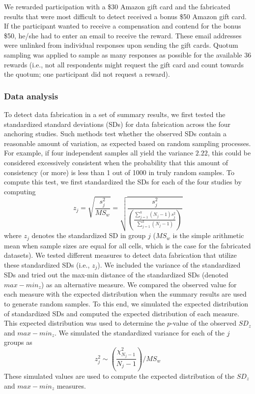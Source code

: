 \documentclass{article}
\begin{document}
We rewarded participation with a \$30 Amazon gift card and the fabricated results that were most difficult to detect received a bonus \$50 Amazon gift card. If the participant wanted to receive a compensation and contend for the bonus \$50, he/she had to enter an email to receive the reward. These email addresses were unlinked from individual responses upon sending the gift cards. Quotum sampling was applied to sample as many responses as possible for the available 36 rewards (i.e., not all respondents might request the gift card and count towards the quotum; one participant did not request a reward).

\subsubsection*{Data analysis}

To detect data fabrication in a set of summary results, we first tested the standardized standard deviations (SDs) for data fabrication \citep{simonsohn2013} across the four anchoring studies. Such methods test whether the observed SDs contain a reasonable amount of variation, as expected based on random sampling processes. For example, if four independent samples all yield the variance $2.22$, this could be considered excessively consistent when the probability that this amount of consistency (or more) is less than 1 out of 1000 in truly random samples. To compute this test, we first standardized the SDs for each of the four studies by computing
\begin{equation}
z_j=\sqrt{\frac{s^2_j}{MS_w}}=\sqrt{\frac{s^2_j}{\left(\frac{\sum\limits^k_{j=1}(N_j-1)s^2_j}{\sum\limits^k_{j=1}(N_j-1)}\right)}}
\label{s2_j}
\end{equation}
where $z_j$ denotes the standardized SD in group $j$ ($MS_w$ is the simple arithmetic mean when sample sizes are equal for all cells, which is the case for the fabricated datasets). We tested different measures to detect data fabrication that utilize these standardized SDs (i.e., $z_j$). We included the variance of the standardized SDs \citep[i.e.,  $SD_{z}$;][]{simonsohn2013} and tried out the max-min distance of the standardized SDs (denoted $max-min_{z}$) as an alternative measure. We compared the observed value for each measure with the expected distribution when the summary results are used to generate random samples. To this end, we simulated the expected distribution of standardized SDs and computed the expected distribution of each measure. This expected distribution was used to determine the $p$-value of the observed $SD_z$ and $max-min_z$. We simulated the standardized variance for each of the $j$ groups as
\begin{equation}
z^2_j\sim\left(\frac{\chi^2_{N_j-1}}{N_j-1}\right)/MS_w
\label{simvar}
\end{equation}
These simulated values are used to compute the expected distribution of the $SD_z$ and $max-min_z$  measures.
\end{document}
